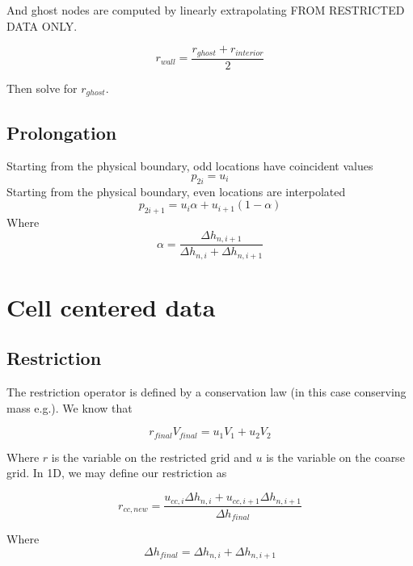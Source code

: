 \documentclass[11pt]{article}
\begin{document}
And ghost nodes are computed by linearly extrapolating FROM RESTRICTED DATA ONLY.

\begin{equation}
	r_{wall} = \frac{r_{ghost}+r_{interior}}{2}
\end{equation}

Then solve for $r_{ghost}$.

\subsection{Prolongation}
Starting from the physical boundary, odd locations have coincident values
\begin{equation}
	p_{2i} = u_{i}
\end{equation}
Starting from the physical boundary, even locations are interpolated
\begin{equation}
	p_{2i+1} = u_{i}\alpha + u_{i+1}(1 - \alpha)
\end{equation}
Where
\begin{equation}
	\alpha = \frac{\Delta h_{n,i+1}}{\Delta h_{n,i} + \Delta h_{n,i+1}}
\end{equation}

\section{Cell centered data}

\subsection{Restriction}
The restriction operator is defined by a conservation law (in this case conserving mass e.g.). We know that

\begin{equation}
	r_{final} V_{final} = u_1 V_1 + u_2 V_2
\end{equation}

Where $r$ is the variable on the restricted grid and $u$ is the variable on the coarse grid.
In 1D, we may define our restriction as

\begin{equation}
	r_{cc,new} = \frac{u_{cc,i} \Delta h_{n,i} +u_{cc,i+1} \Delta h_{n,i+1} }{\Delta h_{final}}
\end{equation}

Where
\begin{equation}
	\Delta h_{final} = \Delta h_{n,i} + \Delta h_{n,i+1}
\end{equation}
\end{document}
